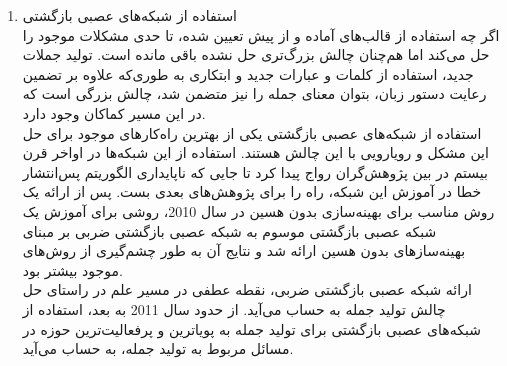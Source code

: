 \begin{enumerate}
\item استفاده از شبکه‌های عصبی بازگشتی
\\
اگر چه استفاده از قالب‌های آماده و از پیش تعیین شده، تا حدی مشکلات موجود را حل می‌کند اما هم‌چنان چالش بزرگ‌تری حل نشده باقی مانده است. تولید جملات جدید، استفاده از کلمات و عبارات جدید و ابتکاری به طوری‌که علاوه بر تضمین رعایت دستور زبان، بتوان معنای جمله را نیز متضمن شد، چالش بزرگی است که در این مسیر کماکان وجود دارد.
\\
استفاده از شبکه‌های عصبی بازگشتی یکی از بهترین راه‌کارهای موجود برای حل این مشکل و رویارویی با این چالش هستند. استفاده از این شبکه‌ها در اواخر قرن بیستم در بین پژوهش‌گران رواج پیدا کرد تا جایی که ناپایداری الگوریتم پس‌انتشار خطا در آموزش این شبکه، راه را برای پژوهش‌های بعدی بست. پس از ارائه یک روش مناسب برای بهینه‌سازی بدون هسین در سال 2010، روشی برای آموزش یک شبکه عصبی بازگشتی موسوم به شبکه عصبی بازگشتی ضربی بر مبنای بهینه‌سازهای بدون هسین ارائه شد و نتایج آن به طور چشم‌گیری از روش‌های موجود بیشتر بود.
\\
ارائه شبکه عصبی بازگشتی ضربی، نقطه عطفی در مسیر علم در راستای حل چالش تولید جمله به حساب می‌آید. از حدود سال 2011 به بعد، استفاده از شبکه‌های عصبی بازگشتی برای تولید جمله به پویاترین و پرفعالیت‌ترین حوزه در مسائل مربوط به تولید جمله، به حساب می‌آید.
\end{enumerate}
